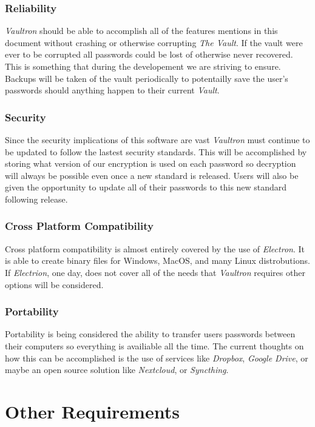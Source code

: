 \documentclass[11pt]{report}
\begin{document}
\subsection{Reliability}
\textit{Vaultron} should be able to accomplish all of the features
mentions in this document without crashing or otherwise corrupting
\textit{The Vault}. If the vault were ever to be corrupted all
passwords could be lost of otherwise never recovered. This is something
that during the developement we are striving to ensure. Backups will
be taken of the vault periodically to potentailly save the user's
passwords should anything happen to their current \textit{Vault}.

\subsection{Security}
Since the security implications of this software are vast
\textit{Vaultron} must continue to be updated to follow the lastest
security standards. This will be accomplished by storing what version
of our encryption is used on each password so decryption will always
be possible even once a new standard is released. Users will also
be given the opportunity to update all of their passwords to this
new standard following release.

\subsection{Cross Platform Compatibility}
Cross platform compatibility is almost entirely covered by the use
of \textit{Electron}. It is able to create binary files for Windows,
MacOS, and many Linux distrobutions. If \textit{Electrion}, one day,
does not cover all of the needs that \textit{Vaultron} requires other
options will be considered. 

\subsection{Portability}
Portability is being considered the ability to transfer users passwords
between their computers so everything is availiable all the time. The
current thoughts on how this can be accomplished is the use of services
like \textit{Dropbox}, \textit{Google Drive}, or maybe an open source
solution like \textit{Nextcloud}, or \textit{Syncthing}. 




\chapter{Other Requirements}
\end{document}
